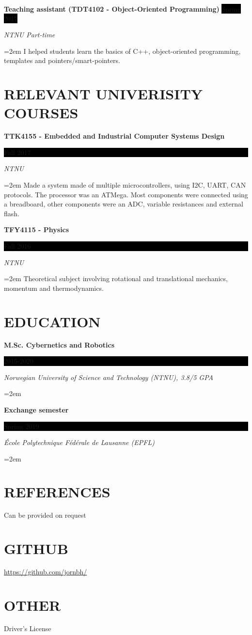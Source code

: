 \documentclass[paper=a4,fontsize=11pt,norsk]{scrartcl} %
\newlength{\spacebox}
\newcommand{\NewPart}[1]{\section*{\uppercase{#1}}}
\newcommand{\PersonalEntry}[2]{
		\noindent\hangindent=2em\hangafter=0 %
		\parbox{\spacebox}{        %
		\textit{#1}}		       %
		\hspace{1.5em} #2 \par}    %
\newcommand{\EducationEntry}[4]{
		\noindent \textbf{#1} \hfill      %
		\colorbox{Black}{%
			\parbox{6em}{%
			\hfill\color{White}#2}} \par  %
		\noindent \textit{#3} \par        %
		\noindent\hangindent=2em\hangafter=0 \small #4 %
		\normalsize \par}
\newcommand{\WorkEntry}[4]{				  %
		\noindent \textbf{#1} \hfill      %
		\colorbox{Black}{\color{White}#2} \par  %
		\noindent \textit{#3} \par              %
		\noindent\hangindent=2em\hangafter=0 \small #4 %
		\normalsize \par}
\begin{document}
\WorkEntry{Teaching assistant (TDT4102 - Object-Oriented Programming)}{Spring 2017}{NTNU Part-time}
{I helped students learn the basics of C++, object-oriented programming, templates and pointers/smart-pointers. 
}


\NewPart{Relevant univerisity Courses}{}

\EducationEntry{TTK4155 - Embedded and Industrial Computer Systems Design}{Fall 2017}{NTNU}
{Made a system made of multiple microcontrollers, using I2C, UART, CAN protocols. The processor was an ATMega. Most components were connected using a breadboard, other components were an ADC, variable resistances and external flash. 
}


\EducationEntry{TFY4115 - Physics}{Fall 2016}{NTNU}
{Theoretical subject involving rotational and translational mechanics, momentum and thermodynamics.}






\NewPart{Education}{}

\EducationEntry{M.Sc. Cybernetics and Robotics}{2015-2020}{Norwegian University of Science and Technology (NTNU), 3.8/5 GPA}{}
\EducationEntry{Exchange semester}{Spring 2019}{École Polytechnique Fédérale de Lausanne (EPFL)}{}





\NewPart{References}{}
Can be provided on request



\NewPart{GitHub}{}
\url{https://github.com/jornbh/}
\NewPart{Other}{}
Driver's License
\end{document}
